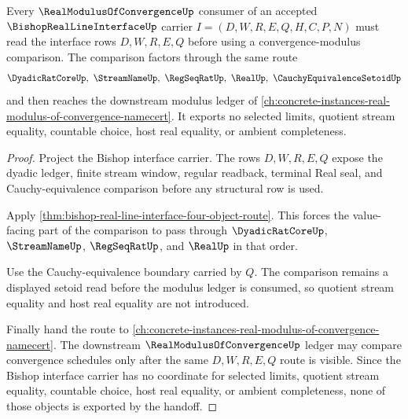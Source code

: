 \begin{theorem}
\label{thm:bishop-real-line-interface-modulus-comparison-handoff}
Every $\RealModulusOfConvergenceUp$ consumer of an accepted $\BishopRealLineInterfaceUp$ carrier $I=(D,W,R,E,Q,H,C,P,N)$ must read the interface rows $D,W,R,E,Q$ before using a convergence-modulus comparison. The comparison factors through the same route
$$
\DyadicRatCoreUp,\ \StreamNameUp,\ \RegSeqRatUp,\ \RealUp,\ \CauchyEquivalenceSetoidUp
$$
and then reaches the downstream modulus ledger of \autoref{ch:concrete-instances-real-modulus-of-convergence-namecert}. It exports no selected limits, quotient stream equality, countable choice, host real equality, or ambient completeness.
\end{theorem}
\begin{proof}
Project the Bishop interface carrier. The rows $D,W,R,E,Q$ expose the dyadic ledger, finite stream window, regular readback, terminal Real seal, and Cauchy-equivalence comparison before any structural row is used.

Apply \autoref{thm:bishop-real-line-interface-four-object-route}. This forces the value-facing part of the comparison to pass through $\DyadicRatCoreUp$, $\StreamNameUp$, $\RegSeqRatUp$, and $\RealUp$ in that order.

Use the Cauchy-equivalence boundary carried by $Q$. The comparison remains a displayed setoid read before the modulus ledger is consumed, so quotient stream equality and host real equality are not introduced.

Finally hand the route to \autoref{ch:concrete-instances-real-modulus-of-convergence-namecert}. The downstream $\RealModulusOfConvergenceUp$ ledger may compare convergence schedules only after the same $D,W,R,E,Q$ route is visible. Since the Bishop interface carrier has no coordinate for selected limits, quotient stream equality, countable choice, host real equality, or ambient completeness, none of those objects is exported by the handoff.
\end{proof}

